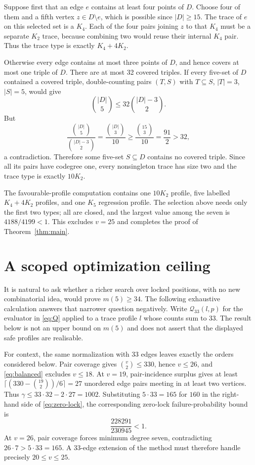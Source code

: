 \documentclass[11pt]{article}
\theoremstyle{remark}
\newcommand{\Qlock}{\mathcal{Q}}
\begin{document}
Suppose first that an edge $e$ contains at least four points of $D$.  Choose
four of them and a fifth vertex $z\in D\setminus e$, which is possible since
$|D|\ge15$.  The trace of $e$ on this selected set is a $K_4$.  Each of the
four pairs joining $z$ to that $K_4$ must be a separate $K_2$ trace, because
combining two would reuse their internal $K_4$ pair.  Thus the trace type is
exactly $K_4+4K_2$.

Otherwise every edge contains at most three points of $D$, and hence covers
at most one triple of $D$.  There are at most 32 covered triples.  If every
five-set of $D$ contained a covered triple, double-counting pairs $(T,S)$
with $T\subseteq S$, $|T|=3$, $|S|=5$, would give
\[
\binom{|D|}{5}\le32\binom{|D|-3}{2}.
\]
But
\[
\frac{\binom{|D|}{5}}{\binom{|D|-3}{2}}
=\frac{\binom{|D|}{3}}{10}
\ge\frac{\binom{15}{3}}{10}=\frac{91}{2}>32,
\]
a contradiction.  Therefore some five-set $S\subseteq D$ contains no
covered triple.  Since all its pairs have codegree one, every nonsingleton
trace has size two and the trace type is exactly $10K_2$.

The favourable-profile computation contains one $10K_2$ profile, five
labelled $K_4+4K_2$ profiles, and one $K_5$ regression profile.  The
selection above needs only the first two types; all are closed, and the
largest value among the seven is $4188/4199<1$.  This excludes $v=25$ and
completes the proof of Theorem~\ref{thm:main}.

\section{A scoped optimization ceiling}\label{sec:ceiling}

It is natural to ask whether a richer search over locked positions, with no
new combinatorial idea, would prove $m(5)\ge34$.  The following exhaustive
calculation answers that narrower question negatively.  Write
$\Qlock_{33}(l,p)$ for the evaluator in \eqref{eq:Q} applied to a trace
profile $l$ whose counts sum to 33.  The result below is not an upper bound
on $m(5)$ and does not assert that the displayed safe profiles are
realisable.

For context, the same normalization with 33 edges leaves exactly the orders
considered below.  Pair coverage gives $\binom v2\le330$, hence $v\le26$,
and \eqref{eq:balanced} excludes $v\le18$.  At $v=19$, pair-incidence
surplus gives at least $\lceil(330-\binom{19}{2})/6\rceil=27$ unordered edge
pairs meeting in at least two vertices.  Thus $\gamma\le33\cdot32-2\cdot
27=1002$.  Substituting $5\cdot33=165$ for $160$ in the right-hand side of
\eqref{eq:zero-lock}, the corresponding zero-lock failure-probability bound is
\[
\frac{228291}{230945}<1.
\]
At $v=26$, pair coverage forces minimum degree seven, contradicting
$26\cdot7>5\cdot33=165$.  A 33-edge extension of the method must therefore
handle precisely $20\le v\le25$.
\end{document}
